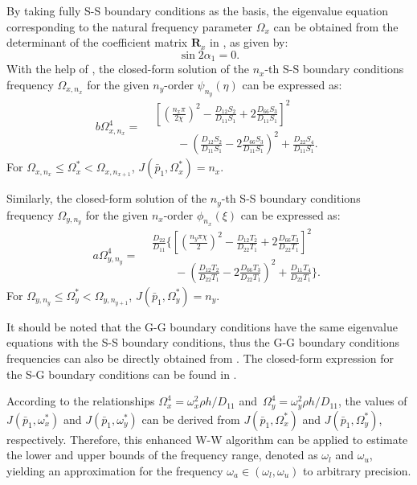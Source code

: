 \documentclass[preprint,12pt,number]{elsarticle}
\begin{document}
By taking fully S-S boundary conditions as the basis, the eigenvalue equation corresponding to the natural frequency parameter $ \Omega_x $ can be obtained from the determinant of the coefficient matrix $ \mathbf{R}_x $ in , as given by:
%
\begin{equation}\label{eq:SSx} 
\sin 2\alpha_1 = 0.
\end{equation}
%
With the help of , the closed-form solution of the $n_x$-th S-S boundary conditions frequency $\Omega_{x,n_x}$ for the given $n_y$-order $\psi_{n_y}(\eta)$ can be expressed as:
%
\begin{equation}\label{eq:J_simpx}
b \Omega^4_{x,n_x} =
\begin{aligned}
	&\left[\left(\frac{n_x\pi}{2\chi}\right)^2 - \frac{D_{12}S_2}{D_{11}S_1} + 2 \frac{D_{66}S_3}{D_{11}S_1}\right]^2 \\
	&\qquad- \left(\frac{D_{12}S_2}{D_{11}S_1} - 2 \frac{D_{66}S_3}{D_{11}S_1}\right)^2
	+ \frac{D_{22}S_4}{D_{11}S_1}.
\end{aligned}
\end{equation}
%
For $\Omega_{x,n_x} \leq \Omega_x^* < \Omega_{x,n_{x+1}}$, $J(\bar{p}_1, \Omega_x^*) = n_x$.

Similarly, the closed-form solution of the $n_y$-th S-S boundary conditions frequency $\Omega_{y,n_y}$ for the given $n_x$-order $\phi_{n_x}(\xi)$ can be expressed as:
%
\begin{equation}\label{eq:J_simpy}
a\Omega^4_{y,n_y}= 
\begin{aligned}
	&\frac{D_{22}}{D_{11}}\Biggl\{\left[\left(\frac{n_y\pi\chi}{2}\right)^2 - \frac{D_{12}T_2}{D_{22}T_1} + 2 \frac{D_{66}T_3}{D_{22}T_1}\right]^2 \\ 
	&\qquad - \left(\frac{D_{12}T_2}{D_{22}T_1} - 2 \frac{D_{66}T_3}{D_{22}T_1}\right)^2
	+ \frac{D_{11}T_4}{D_{22}T_1}\Biggr\}.
\end{aligned}
\end{equation}
%
For $\Omega_{y,n_y} \leq \Omega_y^* < \Omega_{y,n_{y+1}}$, $J(\bar{p}_1, \Omega_y^*) = n_y$.

It should be noted that the G-G boundary conditions have the same eigenvalue equations with the S-S boundary conditions, thus the G-G boundary conditions frequencies can also be directly obtained from .
The closed-form expression for the S-G boundary conditions can be found in .

According to the relationships 
$\Omega^4_x = {{\omega_x^2 \rho h}/{D_{11}}}$ and\ $\Omega^4_y = {{\omega_y^2 \rho h}/{D_{11}}}$, 
the values of $J(\bar{p}_1, \omega_x^*)$ and $J(\bar{p}_1, \omega_y^*)$ can be derived from $J(\bar{p}_1, \Omega_x^*)$ and $J(\bar{p}_1, \Omega_y^*)$, respectively. 
Therefore, this enhanced W-W algorithm can be applied to estimate the lower and upper bounds of the frequency range, denoted as $\omega_l$ and $\omega_u$, yielding an approximation for the frequency $\omega_a \in (\omega_l, \omega_u)$ to arbitrary precision.
\end{document}
